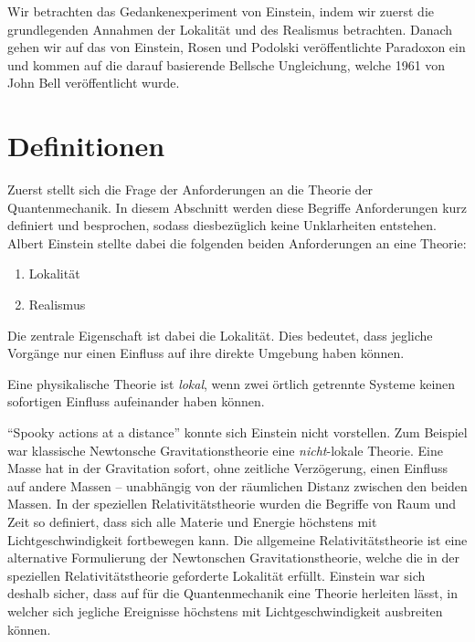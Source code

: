 \begin{refsection}
Wir betrachten das Gedankenexperiment von Einstein, indem wir zuerst die
grundlegenden Annahmen der Lokalit\"at und des Realismus betrachten. Danach
gehen wir auf das von Einstein, Rosen und Podolski ver\"offentlichte Paradoxon
ein und kommen auf die darauf basierende Bellsche Ungleichung, welche
1961 von John Bell ver\"offentlicht wurde.

\section{Definitionen\label{section:bell:definitionen}}
Zuerst stellt sich die Frage der Anforderungen an die Theorie der
Quantenmechanik.
In diesem Abschnitt werden diese Begriffe Anforderungen kurz definiert und
besprochen, sodass diesbez\"uglich keine Unklarheiten entstehen.
Albert Einstein stellte dabei die folgenden beiden Anforderungen an eine
Theorie:

\begin{enumerate}
    \item Lokalit\"at
    \item Realismus
\end{enumerate}

Die zentrale Eigenschaft ist dabei die Lokalit\"at.
Dies bedeutet, dass jegliche Vorg\"ange nur einen Einfluss
auf ihre direkte Umgebung haben k\"onnen.

\begin{definition}\label{def:bell:lokalitaet}
    Eine physikalische Theorie ist \emph{lokal}, wenn zwei \"ortlich getrennte
    Systeme keinen sofortigen Einfluss aufeinander haben k\"onnen.
\end{definition}

\foreignquote{english}{Spooky actions at a distance} \cite[S.~158]{Bell:BornEinstein1971}
konnte sich Einstein nicht vorstellen.
Zum Beispiel war klassische Newtonsche Gravitationstheorie
eine \emph{nicht}-lokale Theorie. 
Eine Masse hat in der Gravitation sofort, ohne zeitliche 
Verz\"ogerung, einen Einfluss auf andere Massen -- unabh\"angig von der
r\"aumlichen Distanz zwischen den beiden Massen. 
In der speziellen Relativit\"atstheorie wurden die Begriffe von Raum und Zeit
so definiert, dass sich alle Materie und Energie h\"ochstens mit
Lichtgeschwindigkeit fortbewegen kann. 
Die allgemeine Relativit\"atstheorie ist eine alternative Formulierung
der Newtonschen Gravitationstheorie, welche die in der speziellen
Relativit\"atstheorie geforderte Lokalit\"at erf\"ullt.
Einstein war sich deshalb sicher, dass auf f\"ur die Quantenmechanik eine
Theorie herleiten l\"asst, in welcher sich jegliche Ereignisse h\"ochstens mit
Lichtgeschwindigkeit ausbreiten k\"onnen.


\end{refsection}
